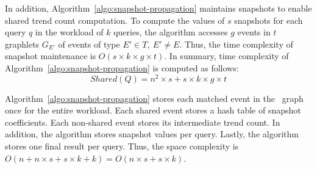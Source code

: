 In addition, Algorithm~\ref{algo:snapshot-propagation} maintains snapshots to enable shared trend count computation.
To compute the values of $s$ snapshots for each query $q$ in the workload of $k$ queries, the algorithm accesses $g$ events in $t$ graphlets $G_{E'}$ of events of type $E' \in T,\ E' \neq E$. Thus, the time complexity of snapshot maintenance is $O(s \times k \times g \times t)$. 
%
In summary,  time complexity of Algorithm~\ref{algo:snapshot-propagation} is computed as follows:
%
\begin{equation}
\mathit{Shared}(Q) = n^2 \times s + s \times k \times g \times t
\label{eq:shared-cost}
\end{equation}

Algorithm~\ref{algo:snapshot-propagation} stores each matched event in the \app\ graph once for the entire workload.
Each shared event stores a hash table of snapshot coefficients.
Each non-shared event stores its intermediate trend count.
In addition, the algorithm stores snapshot values per query. 
Lastly, the algorithm stores one final result per query.
%
Thus, the space complexity is $O(n + n \times s + s \times k + k) = O(n \times s + s \times k)$.
